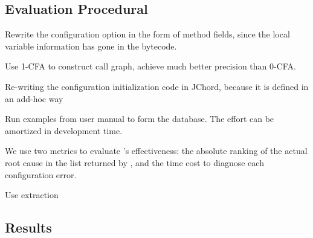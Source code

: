 
\subsection{Evaluation Procedural}


Rewrite the configuration option in the form of method fields, since
the local variable information has gone in the bytecode.

Use 1-CFA to construct call graph, achieve much better precision
than 0-CFA. 

Re-writing the configuration initialization code in JChord, because
it is defined in an add-hoc way

Run examples from user manual to form the database. The effort
can be amortized in development time.

We use two metrics to evaluate \ourtool's effectiveness: the absolute ranking of the
actual root cause in the list returned by \ourtool, and the
time cost to diagnose each configuration error.

Use extraction~\cite{Rabkin:2011:SEP}


\subsection{Results}

